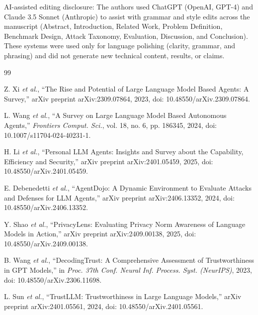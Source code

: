 \documentclass{ieeeaccess}
\begin{document}
AI-assisted editing disclosure: The authors used ChatGPT (OpenAI, GPT-4) and Claude 3.5 Sonnet (Anthropic) to assist with grammar and style edits across the manuscript (Abstract, Introduction, Related Work, Problem Definition, Benchmark Design, Attack Taxonomy, Evaluation, Discussion, and Conclusion). These systems were used only for language polishing (clarity, grammar, and phrasing) and did not generate new technical content, results, or claims.

\begin{thebibliography}{99}


Z. Xi \emph{et al.}, ``The Rise and Potential of Large Language Model Based Agents: A Survey,'' arXiv preprint arXiv:2309.07864, 2023, doi: 10.48550/arXiv.2309.07864.

L. Wang \emph{et al.}, ``A Survey on Large Language Model Based Autonomous Agents,'' \emph{Frontiers Comput. Sci.}, vol. 18, no. 6, pp. 186345, 2024, doi: 10.1007/s11704-024-40231-1.

H. Li \emph{et al.}, ``Personal LLM Agents: Insights and Survey about the Capability, Efficiency and Security,'' arXiv preprint arXiv:2401.05459, 2025, doi: 10.48550/arXiv.2401.05459.

E. Debenedetti \emph{et al.}, ``AgentDojo: A Dynamic Environment to Evaluate Attacks and Defenses for LLM Agents,'' arXiv preprint arXiv:2406.13352, 2024, doi: 10.48550/arXiv.2406.13352.

Y. Shao \emph{et al.}, ``PrivacyLens: Evaluating Privacy Norm Awareness of Language Models in Action,'' arXiv preprint arXiv:2409.00138, 2025, doi: 10.48550/arXiv.2409.00138.

B. Wang \emph{et al.}, ``DecodingTrust: A Comprehensive Assessment of Trustworthiness in GPT Models,'' in \emph{Proc. 37th Conf. Neural Inf. Process. Syst. (NeurIPS)}, 2023, doi: 10.48550/arXiv.2306.11698.

L. Sun \emph{et al.}, ``TrustLLM: Trustworthiness in Large Language Models,'' arXiv preprint arXiv:2401.05561, 2024, doi: 10.48550/arXiv.2401.05561.


\end{thebibliography}
\end{document}
